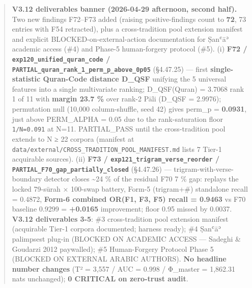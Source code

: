 \documentclass[
]{article}
\begin{document}
\begin{quote}
\textbf{V3.12 deliverables banner (2026-04-29 afternoon, second half).}
Two new findings F72--F73 added (raising positive-findings count to
\textbf{72}, 73 entries with F54 retracted), plus a cross-tradition pool
extension manifest and explicit BLOCKED-on-external-action documentation
for Ṣanʿāʾ academic access (\#4) and Phase-5 human-forgery protocol
(\#5). (i) \textbf{F72 / \texttt{exp120\_unified\_quran\_code} /
\texttt{PARTIAL\_quran\_rank\_1\_perm\_p\_above\_0p05}} (§4.47.25) ---
first \textbf{single-statistic Quran-Code distance D\_QSF} unifying the
5 universal features into a single multivariate ranking; D\_QSF(Quran) =
3.7068 rank 1 of 11 with \textbf{margin 23.7 \%} over rank-2 Pāli
(D\_QSF = 2.9976); permutation null (10,000 column-shuffle, seed 42)
gives perm\_p = \textbf{0.0931}, just above PERM\_ALPHA = 0.05 due to
the rank-saturation floor \texttt{1/N=0.091} at N=11. PARTIAL\_PASS
until the cross-tradition pool extends to N ≥ 22 corpora (manifest at
\texttt{data/external/CROSS\_TRADITION\_POOL\_MANIFEST.md} lists 7
Tier-1 acquirable sources). (ii) \textbf{F73 /
\texttt{exp121\_trigram\_verse\_reorder} /
\texttt{PARTIAL\_F70\_gap\_partially\_closed}} (§4.47.26) ---
trigram-with-verse-boundary detector closes \textasciitilde24 \% of the
residual F70 7 \% gap: replays the locked 79-sūrah × 100-swap battery,
Form-5 (trigram+\#) standalone recall = 0.4872, \textbf{Form-6 combined
OR(F1, F3, F5) recall = 0.9463} vs F70 baseline 0.9299 =
\textbf{+0.0165} improvement; floor 0.95 missed by 0.0037. \textbf{V3.12
deliverables 3-5}: \#3 cross-tradition pool extension manifest
(acquirable Tier-1 corpora documented; harness ready); \#4 Ṣanʿāʾ
palimpsest plug-in (BLOCKED ON ACADEMIC ACCESS --- Sadeghi \& Goudarzi
2012 paywalled); \#5 Human-Forgery Protocol Phase 5 (BLOCKED ON EXTERNAL
ARABIC AUTHORS). \textbf{No headline number changes} (T² = 3,557 / AUC =
0.998 / Φ\_master = 1,862.31 nats unchanged); \textbf{0 CRITICAL on
zero-trust audit}.
\end{quote}
\end{document}
